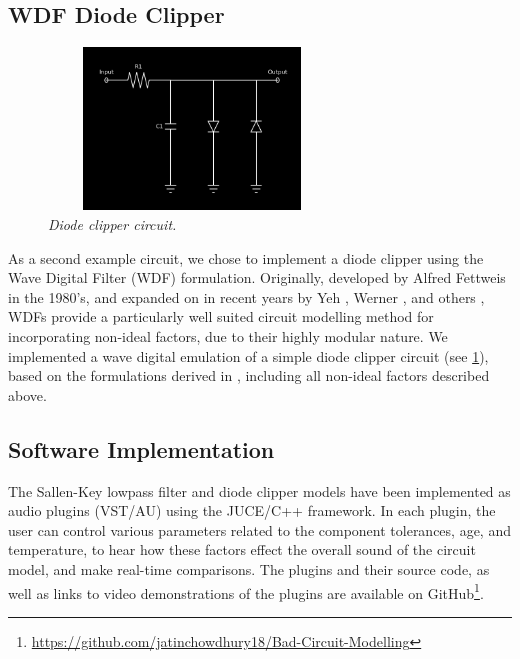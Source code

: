 \documentclass[twoside,a4paper]{article}
\begin{document}
\subsection{WDF Diode Clipper} \label{sec:WDF}
%
\begin{figure}[h]
    \center
    \includegraphics[width=3in,height=1.7in]{Pics/diodeclipper.png}
    \caption{\label{diodeclipper}{\it Diode clipper circuit.}}
\end{figure}
%
As a second example circuit, we chose to implement a diode clipper using
the Wave Digital Filter (WDF) formulation. Originally, developed by
Alfred Fettweis \cite{Fettweis} in the 1980's, and expanded on in recent
years by Yeh \cite{YehWDF}, Werner \cite{KurtThesis}, and others
\cite{JJWDF,WDF2}, WDFs provide a particularly well suited circuit
modelling method for incorporating non-ideal factors, due to their highly
modular nature. We implemented a wave digital emulation of a simple diode
clipper circuit (see \cref{diodeclipper}), based on the formulations
derived in \cite{YehDiode,KurtDiode}, including all non-ideal factors
described above.

\subsection{Software Implementation} \label{sec:soft-impl}
%
The Sallen-Key lowpass filter and diode clipper models have been implemented
as audio plugins (VST/AU) using the JUCE/C++ framework. In each plugin,
the user can control various parameters related to the component
tolerances, age, and temperature, to hear how these factors effect the
overall sound of the circuit model, and make real-time comparisons. The
plugins and their source code, as well as links to video demonstrations
of the plugins are available on
GitHub\footnote{\url{https://github.com/jatinchowdhury18/Bad-Circuit-Modelling}}.
\end{document}
